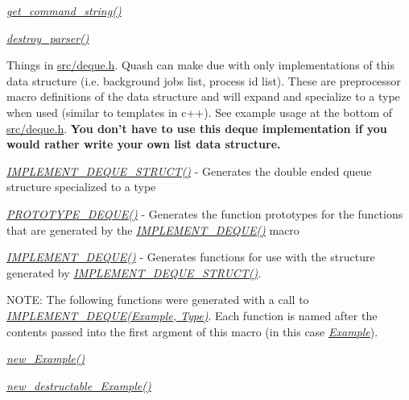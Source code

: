 \begin{DoxyItemize}
\item {\itshape \hyperlink{quash_8c_ab43880685b2507434e4a84f2cb9d54d4}{get\-\_\-command\-\_\-string()}} 
\item {\itshape \hyperlink{parsing__interface_8h_a659361d40550d9776b6ea7fa69a836ce}{destroy\-\_\-parser()}} 
\item Things in \hyperlink{deque_8h}{src/deque.\-h}. Quash can make due with only implementations of this data structure (i.\-e. background jobs list, process id list). These are preprocessor macro definitions of the data structure and will expand and specialize to a type when used (similar to templates in c++). See example usage at the bottom of \hyperlink{deque_8h}{src/deque.\-h}. {\bfseries You don't have to use this deque implementation if you would rather write your own list data structure.}
\begin{DoxyItemize}
\item {\itshape \hyperlink{deque_8h_a091cfc1289538b13036bcd36d12a3c01}{I\-M\-P\-L\-E\-M\-E\-N\-T\-\_\-\-D\-E\-Q\-U\-E\-\_\-\-S\-T\-R\-U\-C\-T()}} -\/ Generates the double ended queue structure specialized to a type
\item {\itshape \hyperlink{deque_8h_af9dc10c0d5c775afe3053629e39f8c36}{P\-R\-O\-T\-O\-T\-Y\-P\-E\-\_\-\-D\-E\-Q\-U\-E()}} -\/ Generates the function prototypes for the functions that are generated by the {\itshape \hyperlink{deque_8h_a71fbe309fa88eb8d294b141f33d81233}{I\-M\-P\-L\-E\-M\-E\-N\-T\-\_\-\-D\-E\-Q\-U\-E()}} macro
\item {\itshape \hyperlink{deque_8h_a71fbe309fa88eb8d294b141f33d81233}{I\-M\-P\-L\-E\-M\-E\-N\-T\-\_\-\-D\-E\-Q\-U\-E()}} -\/ Generates functions for use with the structure generated by {\itshape \hyperlink{deque_8h_a091cfc1289538b13036bcd36d12a3c01}{I\-M\-P\-L\-E\-M\-E\-N\-T\-\_\-\-D\-E\-Q\-U\-E\-\_\-\-S\-T\-R\-U\-C\-T()}}.
\begin{DoxyItemize}
\item N\-O\-T\-E\-: The following functions were generated with a call to {\itshape \hyperlink{deque_8h_a71fbe309fa88eb8d294b141f33d81233}{I\-M\-P\-L\-E\-M\-E\-N\-T\-\_\-\-D\-E\-Q\-U\-E(\-Example, Type)}}. Each function is named after the contents passed into the first argment of this macro (in this case {\itshape \hyperlink{structExample}{Example}}).
\item {\itshape \hyperlink{deque_8h_ae0c6f52c89e2b087e19e3062186144da}{new\-\_\-\-Example()}} 
\item {\itshape \hyperlink{deque_8h_a4a210705b6f22fe97b7033bb8854a4d6}{new\-\_\-destructable\-\_\-\-Example()}} 

\end{DoxyItemize}
\end{DoxyItemize}
\end{DoxyItemize}
